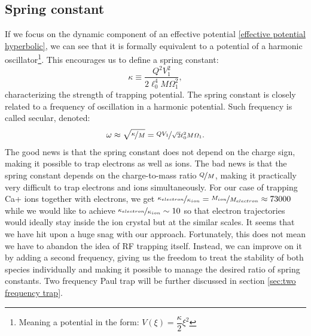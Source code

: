 \subsection{Spring constant}
\label{sec:spring constant}
If we focus on the dynamic component of an effective potential \eqref{effective potential hyperbolic}, we can see that it is formally equivalent to a potential of a harmonic oscillator\footnote{Meaning a potential in the form: $V(\xi) = \dfrac{\kappa}{2} \xi^2$}. This encourages us to define a spring constant: 
\begin{equation}
	\label{spring constant}
	\kappa \equiv \dfrac{Q^2 V_1^2}{2\ell_0^4 M \Omega_1^2},
\end{equation}
characterizing the strength of trapping potential. The spring constant is closely related to a frequency of oscillation in a harmonic potential. Such frequency is called secular, denoted: 
\begin{equation}
	\label{secular frequency}
	\omega \approx \sqrt{\nicefrac{\kappa}{M}} = \nicefrac{Q V_1}{\sqrt{2}\ell_0^2 M \Omega_1}.
\end{equation}
The good news is that the spring constant does not depend on the charge sign, making it possible to trap electrons as well as ions. The bad news is that the spring constant depends on the charge-to-mass ratio $\nicefrac{Q}{M}$, making it practically very difficult to trap electrons and ions simultaneously. For our case of trapping Ca+ ions together with electrons, we get $\nicefrac{\kappa_{electron}}{\kappa_{ion}} = \nicefrac{M_{ion}}{M_{electron}} \approx 73000$ while we would like to achieve $\nicefrac{\kappa_{electron}}{\kappa_{ion}} \sim 10$ so that electron trajectories would ideally stay inside the ion crystal but at the similar scales. It seems that we have hit upon a huge snag with our approach. Fortunately, this does not mean we have to abandon the idea of RF trapping itself. Instead, we can improve on it by adding a second frequency, giving us the freedom to treat the stability of both species individually and making it possible to manage the desired ratio of spring constants. Two frequency Paul trap will be further discussed in section \ref{sec:two frequency trap}.


